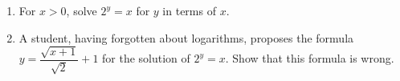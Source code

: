 \begin{enumerate}
\item[(a)] For $x>0$, solve $2^y=x$ for $y$ in terms of $x$.
\item[(b)] A student, having forgotten about logarithms, proposes the formula $y=\dfrac{\sqrt{x+1}}{\sqrt2}+1$ for the solution of $2^y=x$. Show that this formula is wrong.
\end{enumerate}

